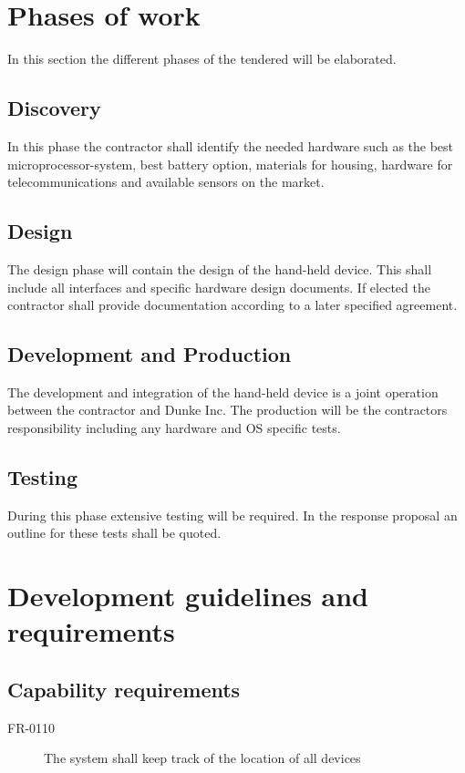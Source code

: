 \section{Phases of work}
In this section the different phases of the tendered will be elaborated. 

\subsection*{Discovery}
In this phase the contractor shall identify the needed hardware such as the best microprocessor-system, best battery option, materials for housing, hardware for telecommunications and available sensors on the market. 

\subsection*{Design}
The design phase will contain the design of the hand-held device. This shall include all interfaces and specific hardware design documents. 
If elected the contractor shall provide documentation according to a later specified agreement. 

\subsection*{Development and Production}
The development and integration of the hand-held device is a joint operation between the contractor and Dunke Inc. The production will be the contractors responsibility including any hardware and OS specific tests. 

\subsection*{Testing}
During this phase extensive testing will be required. In the response proposal an outline for these tests shall be quoted. 

\section{Development guidelines and requirements}
\label{sec:guidelines_and_requirements}


\subsection{Capability requirements}
\begin{description}
\item[FR-0110] The system shall keep track of the location of all devices

\end{description}


